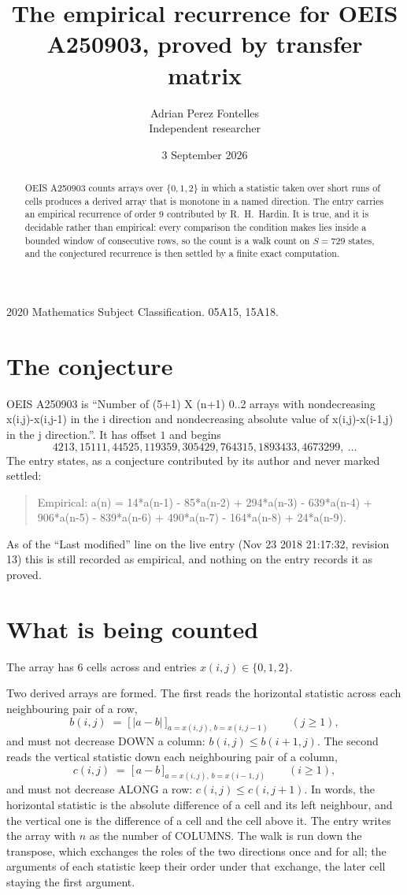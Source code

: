 \documentclass[11pt,a4paper]{article}
\title{The empirical recurrence for OEIS A250903, proved by transfer matrix}
\author{Adrian Perez Fontelles\\ \small Independent researcher}
\date{3 September 2026}
\theoremstyle{plain}
\theoremstyle{definition}
\begin{document}
\maketitle

\begin{abstract}
OEIS A250903 counts arrays over $\{0,1,2\}$ in which a statistic taken over short runs
of cells produces a derived array that is monotone in a named direction. The entry carries an
empirical recurrence of order $9$ contributed by R.~H.~Hardin. It is true, and it is
decidable rather than empirical: every comparison the condition makes lies inside a bounded
window of consecutive rows, so the count is a walk count on $S=729$ states, and the
conjectured recurrence is then settled by a finite exact computation.
\end{abstract}

\noindent\small 2020 Mathematics Subject Classification. 05A15, 15A18.\normalsize

\section{The conjecture}

OEIS A250903 is ``Number of (5+1) X (n+1) 0..2 arrays with nondecreasing x(i,j)-x(i,j-1) in the i direction and nondecreasing absolute value of x(i,j)-x(i-1,j) in the j direction.''. It has offset $1$ and begins
\[
4213, 15111, 44525, 119359, 305429, 764315, 1893433, 4673299,\ \dots
\]
The entry states, as a conjecture contributed by its author and never marked settled:
\begin{quote}
Empirical: a(n) = 14*a(n-1) - 85*a(n-2) + 294*a(n-3) - 639*a(n-4) + 906*a(n-5) - 839*a(n-6) + 490*a(n-7) - 164*a(n-8) + 24*a(n-9).
\end{quote}
As of the ``Last modified'' line on the live entry (Nov 23 2018 21:17:32, revision 13) this is still
recorded as empirical, and nothing on the entry records it as proved.

\section{What is being counted}

The array has $6$ cells across and entries $x(i,j)\in\{0,1,2\}$.

Two derived arrays are formed. The first reads the horizontal statistic across each
neighbouring pair of a row,
\[
b(i,j)\;=\;\bigl[\,\lvert a-b\rvert\,\bigr]_{a=x(i,j),\,b=x(i,j-1)}\qquad (j\ge1),
\]
and must not decrease DOWN a column: $b(i,j)\le b(i{+}1,j)$. The second reads the vertical
statistic down each neighbouring pair of a column,
\[
c(i,j)\;=\;\bigl[\,a-b\,\bigr]_{a=x(i,j),\,b=x(i{-}1,j)}\qquad (i\ge1),
\]
and must not decrease ALONG a row: $c(i,j)\le c(i,j{+}1)$. In words, the horizontal statistic
is the absolute difference of a cell and its left neighbour, and the vertical one is
the difference of a cell and the cell above it. The entry writes the array with $n$ as the number of COLUMNS. The walk is run down the transpose, which exchanges the roles of the two directions once and for all; the arguments of each statistic keep their order under that exchange, the later cell staying the first argument.
\end{document}
